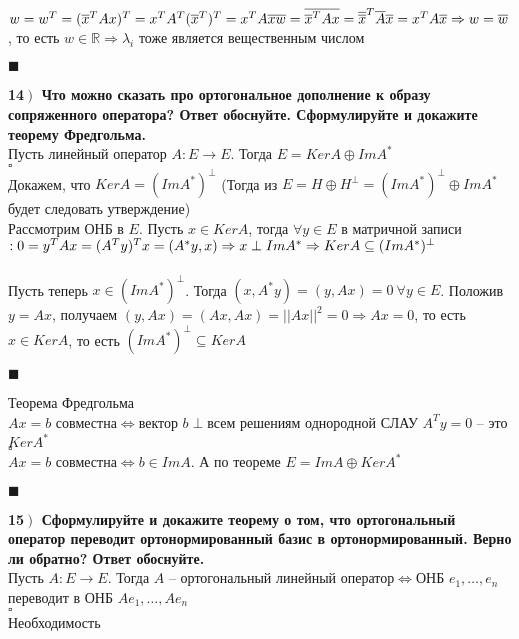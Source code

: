 \documentclass[a4paper,12pt]{article}
\begin{document}
$w=w^T=(\overline x^TAx)^T=x^TA^T(\overline x^T)^T=x^TA\overline x\\
\overline w=\overline{\overline x^TAx}=\overline{\overline x}^T\overline A\overline x=x^TA\overline x\Rightarrow w=\overline w$, то есть $w\in\mathbb{R}\Rightarrow\lambda_i$ тоже является вещественным числом
\begin{flushright}
	$\blacksquare$
\end{flushright}
\textbf{14$\left.\right)$ Что можно сказать про ортогональное дополнение к образу сопряженного оператора? Ответ обоснуйте. Сформулируйте и докажите теорему Фредгольма.}\\
Пусть линейный оператор $A:E\rightarrow E$. Тогда $E=KerA\oplus ImA^*$\\
$\square$\\
Докажем, что $KerA=(ImA^*)^\perp$ (Тогда из $E=H\oplus H^\perp=(ImA^*)^\perp\oplus ImA^*$ будет следовать утверждение)\\
Рассмотрим ОНБ в $E$. Пусть $x\in KerA$, тогда $\forall y\in E$ в матричной записи$:\\ 0=y^TAx=(A^Ty)^Tx=(A^*y, x)\Rightarrow x\perp ImA^*\Rightarrow KerA\subseteq(ImA^*)^\perp$\\\\
Пусть теперь $x\in (ImA^*)^\perp$. Тогда $(x, A^*y)=(y, Ax)=0\ \forall y\in E$. Положив $y=Ax$, получаем $(y, Ax)=(Ax, Ax)=||Ax||^2=0\Rightarrow Ax=0$, то есть $x\in KerA$, то есть $(ImA^*)^\perp\subseteq KerA$
\begin{flushright}
	$\blacksquare$
\end{flushright}
Теорема Фредгольма\\
$Ax=b$ совместна$\Leftrightarrow$вектор $b\perp$всем решениям однородной СЛАУ $A^Ty=0$ -- это $KerA^*$\\
$\square$\\
$Ax=b$ совместна$\Leftrightarrow b\in ImA$. А по теореме $E=ImA\oplus Ker A^*$
\begin{flushright}
	$\blacksquare$
\end{flushright}
\textbf{15$\left.\right)$ Сформулируйте и докажите теорему о том, что ортогональный оператор переводит ортонормированный базис в ортонормированный. Верно ли обратно? Ответ обоснуйте.}\\
Пусть $A:E\rightarrow E$. Тогда $A$ -- ортогональный линейный оператор$\Leftrightarrow$ОНБ $e_1, \ldots, e_n$ переводит в ОНБ $Ae_1, \ldots, Ae_n$\\
$\square$\\
Необходимость\\
\end{document}
